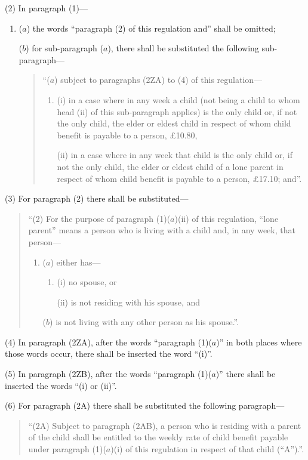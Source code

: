 \documentclass[12pt,a4paper]{article}
\begin{document}
(2) In paragraph (1)—
\begin{enumerate}\item[]
($a$) the words “paragraph (2) of this regulation and” shall be omitted;

($b$) for sub-paragraph ($a$), there shall be substituted the following sub-paragraph—
\begin{quotation}
“($a$) subject to paragraphs (2ZA) to (4) of this regulation—
\begin{enumerate}\item[]
(i) in a case where in any week a child (not being a child to whom head (ii) of this sub-paragraph applies) is the only child or, if not the only child, the elder or eldest child in respect of whom child benefit is payable to a person, £10.80,

(ii) in a case where in any week that child is the only child or, if not the only child, the elder or eldest child of a lone parent in respect of whom child benefit is payable to a person, £17.10; and”.
\end{enumerate}
\end{quotation}
\end{enumerate}

(3) For paragraph (2) there shall be substituted—
\begin{quotation}
“(2) For the purpose of paragraph (1)($a$)(ii) of this regulation, “lone parent” means a person who is living with a child and, in any week, that person—
\begin{enumerate}\item[]
($a$) either has—
\begin{enumerate}\item[]
(i) no spouse, or

(ii) is not residing with his spouse, and
\end{enumerate}

($b$) is not living with any other person as his spouse.”.
\end{enumerate}
\end{quotation}

(4) In paragraph (2ZA), after the words “paragraph (1)($a$)” in both places where those words occur, there shall be inserted the word “(i)”.

(5) In paragraph (2ZB), after the words “paragraph (1)($a$)” there shall be inserted the words “(i) or (ii)”.

(6) For paragraph (2A) there shall be substituted the following paragraph—
\begin{quotation}
“(2A) Subject to paragraph (2AB), a person who is residing with a parent of the child shall be entitled to the weekly rate of child benefit payable under paragraph (1)($a$)(i) of this regulation in respect of that child (“A”).”.
\end{quotation}
\end{document}
